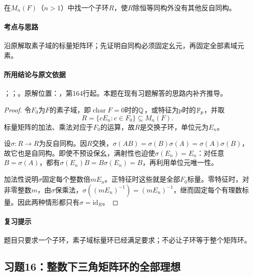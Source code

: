 在$M_n(F)$（$n>1$）中找一个子环$R$，使$R$除恒等同构外没有其他反自同构。

\paragraph{考点与思路}

沿原解取素子域的标量矩阵环；先证明自同构必须固定幺元，再固定全部素域元素。

\paragraph{所用结论与原文依据}

；；。原解位置：，第164行起。本题在现有习题解答的思路内补齐推导。


\begin{proof}

令$F_0$为$F$的素子域，即$\operatorname{char}F=0$时的$\mathbb Q$，或特征为$p$时的$\mathbb F_p$，并取
\[
R=\{cE_n:c\in F_0\}\subseteq M_n(F).
\]
标量矩阵的加法、乘法对应于$F_0$的运算，故$R$是交换子环，单位元为$E_n$。

设$\sigma:R\to R$为反自同构。因$R$交换，$\sigma(AB)=\sigma(B)\sigma(A)=\sigma(A)\sigma(B)$，故它也是自同构。即使不预设保幺，满射性也迫使$\sigma(E_n)=E_n$：对任意$B=\sigma(A)$，都有$\sigma(E_n)B=B\sigma(E_n)=B$，再利用单位元唯一性。

加法性说明$\sigma$固定每个整数倍$mE_n$。正特征时这些就是全部$F_0$标量。零特征时，对非零整数$m$，由$\sigma$保乘法，$\sigma((mE_n)^{-1})=(mE_n)^{-1}$，继而固定每个有理数标量。因此两种情形都只有$\sigma=\mathrm{id}_R$。

\end{proof}

\paragraph{复习提示}

题目只要求一个子环，素子域标量环已经满足要求；不必让子环等于整个矩阵环。



\subsection{习题16：整数下三角矩阵环的全部理想}

\label{ex:3:16}

